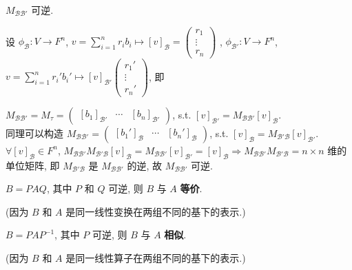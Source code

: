 \documentclass{note}
\begin{document}
$M_{\mathcal{BB}'}$ 可逆.
\begin{pf}
    设 $\phi_{\mathcal{B}}:V\rightarrow F^n$, $v=\sum_{i=1}^nr_ib_i\mapsto[v]_{\mathcal{B}}=\begin{pmatrix}
        r_1\\
        \vdots\\
        r_n
    \end{pmatrix}$ , $\phi_{\mathcal{B}'}:V\rightarrow F^n$, $v=\sum_{i=1}^nr_i'b_i'\mapsto[v]_{\mathcal{B}'}\begin{pmatrix}
        r_1'\\
        \vdots\\
        r_n'
    \end{pmatrix}$, 即
    \begin{center}
    \end{center}
    $M_{\mathcal{BB}'}=M_{\tau}=\begin{pmatrix}
        [b_1]_{\mathcal{B}'}&\cdots&[b_n]_{\mathcal{B}'}
    \end{pmatrix}$, s.t. $[v]_{\mathcal{B}'}=M_{\mathcal{BB}'}[v]_{\mathcal{B}}$.\\
    同理可以构造 $M_{\mathcal{BB}'}=\begin{pmatrix}
        [b_1']_{\mathcal{B}}&\cdots&[b_n']_{\mathcal{B}}
    \end{pmatrix}$, s.t. $[v]_{\mathcal{B}}=M_{\mathcal{B'B}}[v]_{\mathcal{B}'}$.\\
    $\forall[v]_{\mathcal{B}}\in F^n$, $M_{\mathcal{BB}'}M_{\mathcal{B'B}}[v]_{\mathcal{B}}=M_{\mathcal{BB}'}[v]_{\mathcal{B}'}=[v]_{\mathcal{B}}\Longrightarrow M_{\mathcal{BB}'}M_{\mathcal{B'B}}=n\times n$ 维的单位矩阵, 即 $M_{\mathcal{B'B}}$ 是 $M_{\mathcal{BB}'}$ 的逆, 故 $M_{\mathcal{BB}'}$ 可逆.
\end{pf}

\begin{thm}[(课本定理 2.18)]
    $B=PAQ$, 其中 $P$ 和 $Q$ 可逆, 则 $B$ 与 $A$ \textbf{等价}.
\end{thm}
(因为 $B$ 和 $A$ 是同一线性变换在两组不同的基下的表示.)

\begin{thm}[(课本定理 2.19)]
    $B=PAP^{-1}$, 其中 $P$ 可逆, 则 $B$ 与 $A$ \textbf{相似}.
\end{thm}
(因为 $B$ 和 $A$ 是同一线性算子在两组不同的基下的表示.)
\ifx\allfiles\undefined
\end{document}
